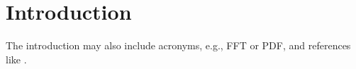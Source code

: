\chapter{Introduction}
\label{chap:Introduction}

The introduction may also include acronyms, e.g., \ac{FFT} or \ac{PDF}, and references like \cite{dummy}.

